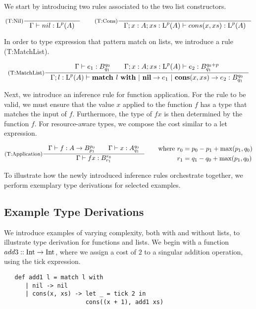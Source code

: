 We start by introducing two rules associated to the two list constructors. 

\[
   \inference[(T:Nil)]
   {}
   {\typing{\Gamma}{nil}{\ralist{p}{A}}}
   \qquad
   \inference[(T:Cons)]
   {}
   {\typing{\Gamma;x : A; xs : \ralist{p}{A}}{cons(x, xs)}{\ralist{p}{A}}}
\]

In order to type expression that pattern match on lists, we introduce a rule (T:MatchList). 

\[
   \inference[(T:MatchList)]
   {\typing{\Gamma}{e_1}{\ratype{B}{q_0}{q_1}} \qquad \typing{\Gamma;x : A; xs : \ralist{p}{A}}{e_2}{\ratype{B}{q_0 + p}{q_1}}}
   {\typing{\Gamma;l : \ralist{p}{A}}{\listmatch{l}{e_1}{e_2}}{\ratype{B}{q_0}{q_1}}}
\]

Next, we introduce an inference rule for function application. For the rule to be valid, we must ensure that the value \(x\) applied to the function \(f\) has a type that matches the input of \(f\). Furthermore, the type of \(f x\) is then determined by the function \(f\). For resource-aware types, we compose the cost similar to a let expression. 

\[
   \inference[(T:Application)]
   {\typing{\Gamma}{f}{\rafunc{A}{B}{p_0}{p_1}} \qquad \typing{\Gamma}{x}{\ratype{A}{q_0}{q_1}}}
   {\typing{\Gamma}{f x}{\ratype{B}{r_0}{r_1}}}
   \qquad
   \begin{aligned}
      \text{where }  & r_0 = p_0 - p_1 + \max(p_1, q_0)\\
                     & r_1 = q_1 - q_0 + \max(p_1, q_0)
   \end{aligned}
\]


To illustrate how the newly introduced inference rules orchestrate together, we perform exemplary type derivations for selected examples.

\subsection{Example Type Derivations}

We introduce examples of varying complexity, both with and without lists, to illustrate type derivation for functions and lists. We begin with a function \(add3 :: \text{Int} \to \text{Int} ^{}_{}\), where we assign a cost of \(2\) to a singular addition operation, using the tick expression.

\begin{verbatim}
   def add1 l = match l with 
      | nil -> nil
      | cons(x, xs) -> let _ = tick 2 in 
                       cons((x + 1), add1 xs)
\end{verbatim}

